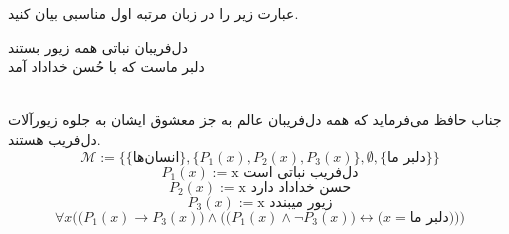 عبارت زیر را در زبان مرتبه اول مناسبی بیان کنید.
	\begin{center}
		دل‌فریبان نباتی همه زیور بستند\\ دلبر ماست که با حُسن خداداد آمد
	\end{center}
	
	\quad\vspace{0.5 cm}
	\begin{ans}
		\\جناب حافظ می‌فرماید که همه دل‌فریبان عالم به جز معشوق ایشان به جلوه زیورآلات دل‌فریب هستند.
	$$
		\mathcal{M} := \{\{\text{انسان‌ها}\}, \{P_1(x), P_2(x), P_3(x)\}, \emptyset, \{\text{دلبر ما}\}\}
	$$
	$$
		{P_1}(x) := \text{x دل‌فریب نباتی است}
	$$
	$$
		{P_2}(x) := \text{x حسن خداداد دارد}
	$$
	$$
		{P_3}(x) := \text{x زیور میبندد}
	$$
	$$
		\forall x \Bigg(\bigg({P_1}(x) \rightarrow {P_3}(x)\bigg) \wedge \bigg(\Big({P_1}(x) \wedge \neg {P_3}(x)\Big) \leftrightarrow \Big(x = \text{دلبر ما} \Big) \bigg)\Bigg)
	$$
	\end{ans}
